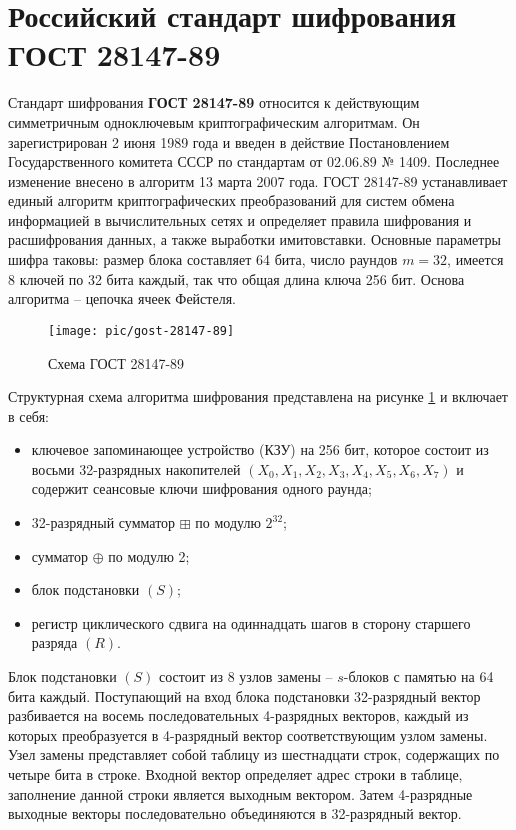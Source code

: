 \section{Российский стандарт шифрования ГОСТ 28147-89}

Стандарт шифрования \textbf{ГОСТ 28147-89} \cite{GOST-89} относится к действующим симметричным одноключевым криптографическим алгоритмам. Он зарегистрирован 2 июня 1989 года и введен в действие Постановлением Государственного комитета СССР по стандартам от 02.06.89 № 1409.
Последнее изменение внесено в алгоритм 13 марта 2007 года.
ГОСТ 28147-89 устанавливает единый алгоритм криптографических преобразований для систем обмена информацией в вычислительных сетях и определяет правила шифрования и расшифрования данных, а также выработки имитовставки. Основные параметры шифра таковы: размер блока составляет 64 бита, число раундов $m=32$, имеется 8 ключей по 32 бита каждый, так что общая длина ключа 256 бит. Основа алгоритма -- цепочка ячеек Фейстеля.

\begin{figure}[!ht]
    \centering
    \texttt{[image: pic/gost-28147-89]}
    \caption{Схема ГОСТ 28147-89\label{fig:gost-28147-89}}
\end{figure}

Структурная схема алгоритма шифрования представлена на рисунке \ref{fig:gost-28147-89} и включает в себя:
\begin{itemize}
    \item ключевое запоминающее устройство (КЗУ) на 256 бит, которое состоит из восьми 32-разрядных накопителей $(X_0, X_1, X_2, X_3, X_4, X_5, X_6, X_7)$ и содержит сеансовые ключи шифрования одного раунда;
    \item 32-разрядный сумматор $\boxplus$ по модулю $2^{32}$;
    \item сумматор $\oplus$ по модулю 2;
    \item блок подстановки $(S)$;
    \item регистр циклического сдвига на одиннадцать шагов в сторону старшего разряда  $(R)$.
\end{itemize}

Блок подстановки $(S)$ состоит из 8 узлов замены -- $s$-блоков с памятью на 64 бита каждый. Поступающий на вход блока подстановки 32-разрядный вектор разбивается на восемь последовательных 4-разрядных векторов, каждый из которых преобразуется в 4-разрядный вектор соответствующим узлом замены. Узел замены представляет собой таблицу из шестнадцати строк, содержащих по четыре бита в строке. Входной вектор определяет адрес строки в таблице, заполнение данной строки является выходным вектором. Затем 4-разрядные выходные векторы последовательно объединяются в 32-разрядный вектор.

